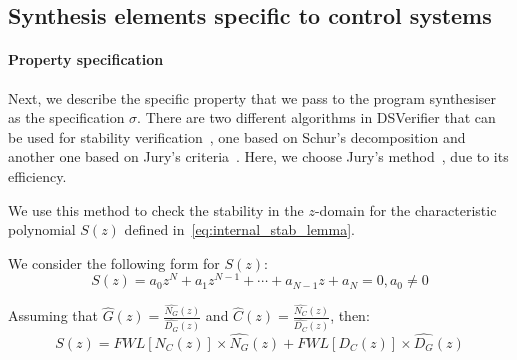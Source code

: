 \documentclass{sig-alternate-05-2015}
\newcommand{\blue}[1]{{\color{blue}#1}}
\newcommand{\red}[1]{{\color{red}#1}}
\begin{document}


\subsection{Synthesis elements specific to control systems}

\paragraph{Property specification}
Next, we describe the specific property that we pass to the program
synthesiser as the specification $\sigma$.  There are two different
algorithms in DSVerifier that can be used for stability
verification~\cite{DBLP:journals/dafes/BessaICF16}, one based on
Schur's decomposition and another one based on Jury's
criteria~\cite{astrom1997computer}.  Here, we choose Jury's
method~\cite{astrom1997computer}, due to its efficiency.

We use this method to check the stability in the $z$-domain for the
characteristic polynomial $S(z)$ defined
in~\eqref{eq:internal_stab_lemma}.

%
We consider the following form for $S(z)$:
%
$$
S(z) = a_0z^N+a_1z^{N-1}+\cdots+a_{N-1}z+a_N=0, a_0\neq0
$$
%

Assuming that $\hat{G}(z) = \frac{\hat{N_G}(z)}{\hat{D_G}(z)}$
and $\hat{C}(z) = \frac{\hat{N_C}(z)}{\hat{D_C}(z)}$, then:
$$S(z) = FWL[N_C(z)] \times \hat{N_G}(z) + FWL[D_C(z)] \times \hat{D_G}(z)$$
\end{document}
